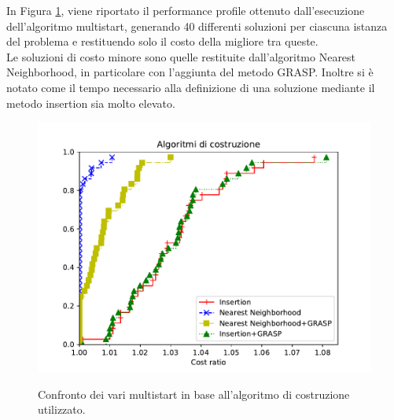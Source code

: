 In Figura \ref{pp_construction}, viene riportato il performance profile ottenuto dall'esecuzione dell'algoritmo multistart, generando 40 differenti soluzioni per ciascuna istanza del problema e restituendo solo il costo della migliore tra queste.\\
Le soluzioni di costo minore sono quelle restituite dall'algoritmo Nearest Neighborhood, in particolare con l'aggiunta del metodo GRASP. 
Inoltre si è notato come il tempo necessario alla definizione di una soluzione mediante il metodo insertion sia molto elevato. 
\begin{figure}[h] 
\begin{center} 
  \includegraphics[scale=0.8]{Images/pp_construction}\\ 
  \caption{\footnotesize{Confronto dei vari multistart in base all'algoritmo di costruzione utilizzato.}}
  \label{pp_construction} 
\end{center} 
\end{figure}
